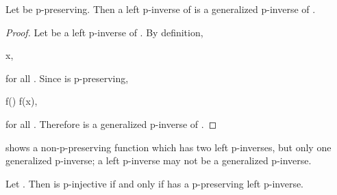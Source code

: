 \documentclass[b5paper, english, oneside]{memoir}
\begin{document}
\begin{theorem}
\label{LeftPInverseIsGeneralizedPInverseForPPreserving}
Let  be p-preserving. Then a left p-inverse of  is a generalized p-inverse of .
\end{theorem}

\begin{proof}
Let  be a left p-inverse of . By definition,
\begin{eqs}
 \preeq x,
\end{eqs}
for all . Since  is p-preserving,
\begin{eqs}
f() \preeqb f(x),
\end{eqs}
for all . Therefore  is a generalized p-inverse of .
\end{proof}

\begin{note}
 shows a non-p-preserving function which has two left p-inverses, but only one generalized p-inverse; a left p-inverse may not be a generalized p-inverse.
\end{note}

\begin{theorem}
\label{PInjectivityIsEquivalentToPPreservingLeftInverse}
Let . Then  is p-injective if and only if  has a p-preserving left p-inverse.
\end{theorem}
\end{document}
